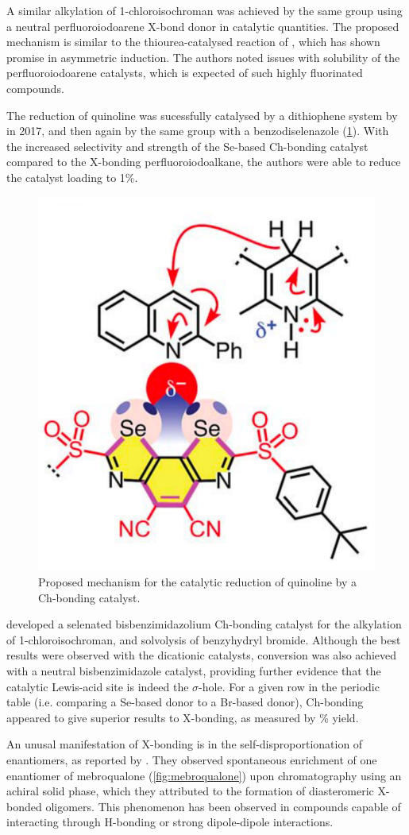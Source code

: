 \begin{refsection}
A similar alkylation of 1-chloroisochroman was achieved by the same group using a neutral perfluoroiodoarene X-bond donor in catalytic quantities.\autocite{Kniep2013}
The proposed mechanism is similar to the thiourea-catalysed reaction of \citeauthor{Reisman2008}\autocite{Reisman2008}, which has shown promise in asymmetric induction.
The authors noted issues with solubility of the perfluoroiodoarene catalysts, which is expected of such highly fluorinated compounds.

The reduction of quinoline was sucessfully catalysed by a dithiophene system by \citeauthor{Benz2017} in 2017\autocite{Benz2017}, and then again by the same group with a benzodiselenazole (\cref{fig:quinoline-redn}).\autocite{Benz2017a}
With the increased selectivity and strength of the Se-based Ch-bonding catalyst compared to the X-bonding perfluoroiodoalkane, the authors were able to reduce the catalyst loading to 1\%.

\begin{figure}
    \centering
    \includegraphics[width=0.4\linewidth]{Figures/quinoline-redn.pdf}
    \caption{Proposed mechanism for the catalytic reduction of quinoline by a Ch-bonding catalyst.\autocite{Benz2017}}
    \label{fig:quinoline-redn}
\end{figure}

\citeauthor{Wonner2017} developed a selenated bisbenzimidazolium Ch-bonding catalyst for the alkylation of 1-chloroisochroman, and solvolysis of benzyhydryl bromide.\autocite{Wonner2017,Wonner2017a}
Although the best results were observed with the dicationic catalysts, conversion was also achieved with a neutral bisbenzimidazole catalyst, providing further evidence that the catalytic Lewis-acid site is indeed the $\sigma$-hole.
For a given row in the periodic table (i.e. comparing a Se-based donor to a Br-based donor), Ch-bonding appeared to give superior results to X-bonding, as measured by \% yield.

An unusal manifestation of X-bonding is in the self-disproportionation of enantiomers, as reported by \citeauthor{Soloshonok2017}.\autocite{Soloshonok2017}
They observed spontaneous enrichment of one enantiomer of mebroqualone (\cref{fig:mebroqualone}) upon chromatography using an achiral solid phase, which they attributed to the formation of diasteromeric X-bonded oligomers.
This phenomenon has been observed in compounds capable of interacting through H-bonding or strong dipole-dipole interactions.\autocite{Cundy1983}


\end{refsection}
